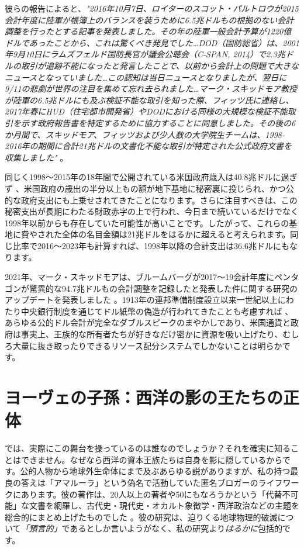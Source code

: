 \documentclass[10pt,twocolumn,letterpaper]{article}
\begin{document}
彼らの報告によると、\textit{"2016年10月7日、ロイターのスコット・パルトロウが2015会計年度に陸軍が帳簿上のバランスを装うために6.5兆ドルもの根拠のない会計調整を行ったとする記事を発表しました。その年の陸軍一般会計予算が1220億ドルであったことから、これは驚くべき発見でした…DOD（国防総省）は、2001年9月10日にラムズフェルド国防長官が議会公聴会（C-SPAN, 2014）で2.3兆ドルの取引が追跡不能になったと発言したことで、以前から会計上の問題で大きなニュースとなっていました…この認知は当日ニュースとなりましたが、翌日に9/11の悲劇が世界の注目を集めて忘れ去られました…マーク・スキッドモア教授が陸軍の6.5兆ドルにも及ぶ検証不能な取引を知った際、フィッツ氏に連絡し、2017年春にHUD（住宅都市開発省）やDODにおける同様の大規模な検証不能取引を示す政府報告書を特定するために協力することに同意しました。その後の6か月間で、スキッドモア、フィッツおよび少人数の大学院生チームは、1998-2016年の期間に合計21兆ドルの文書化不能な取引が特定された公式政府文書を収集しました"} \cite{12}。

同じく1998〜2015年の18年間で公開されている米国政府歳入は40.8兆ドルに過ぎず \cite{15}、米国政府の歳出の半分以上もの額が地下基地に秘密裏に投じられ、かつ公的な政府支出にも上乗せされてきたことになります。さらに注目すべきは、この秘密支出が長期にわたる財政赤字の上で行われ、今日まで続いているだけでなく1998年以前からも存在していた可能性が高いことです。したがって、これらの基地に費やされた全体の名目金額は21兆ドルをはるかに超えると考えられます。同じ比率で2016〜2023年も計算すれば、1998年以降の合計支出は36.6兆ドルにもなります。

2021年、マーク・スキッドモアは、ブルームバーグが2017〜19会計年度にペンタゴンが驚異的な94.7兆ドルもの会計調整を記録したと発表した件に関する研究のアップデートを発表しました \cite{17,18}。1913年の連邦準備制度設立以来一世紀以上にわたり中央銀行制度を通じてドル紙幣の偽造が行われてきたことも考慮すれば \cite{37}、あらゆる公的ドル会計が完全なダブルスピークのまやかしであり、米国通貨と政府は事実上、王族的な所有者たちが好きなだけ密かに資源を吸い上げたり、むしろ大量に抜き取ったりできるリソース配分システムでしかないことは明らかです。

\section{ヨーヴェの子孫：西洋の影の王たちの正体}

では、実際にこの舞台を操っているのは誰なのでしょうか？それを確実に知ることはできません。なぜなら西洋の資本王族たちは自身を影に隠しているからです。公的人物から地球外生命体にまで及ぶあらゆる説がありますが、私の持つ最良の答えは「アマルーラ」という偽名で活動していた匿名ブロガーのライフワークにあります。彼の著作は、20人以上の著者や50にもなろうかという「代替不可能」な文書を網羅し、古代史・現代史・オカルト象徴学・西洋政治などの主題を総合的にまとめ上げたものでした \cite{33,34}。彼の研究は、迫りくる地球物理的破滅について\textit{「預言的」}であるとしか言いようがなく、私の研究より\textit{はるかに}包括的です。
\end{document}
